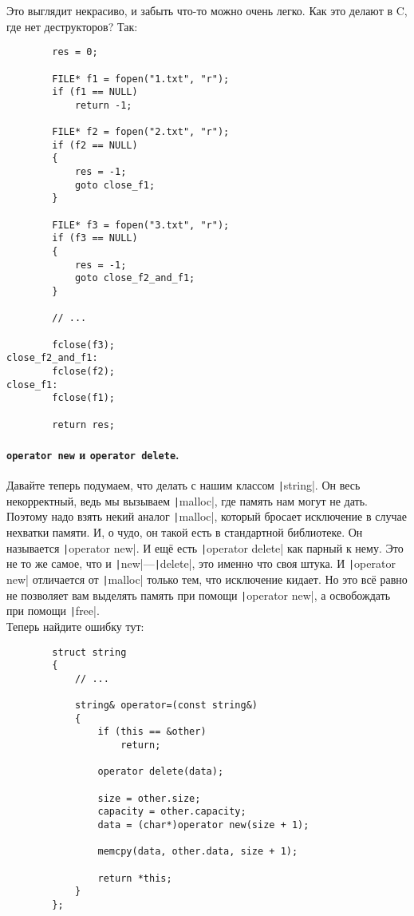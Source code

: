 \documentclass{article}
\begin{document}
    Это выглядит некрасиво, и забыть что-то можно очень легко. Как это делают в C, где нет деструкторов? Так:
    \begin{verbatim}
        res = 0;

        FILE* f1 = fopen("1.txt", "r");
        if (f1 == NULL)
            return -1;
        
        FILE* f2 = fopen("2.txt", "r");
        if (f2 == NULL)
        {
            res = -1;
            goto close_f1;
        }
        
        FILE* f3 = fopen("3.txt", "r");
        if (f3 == NULL)
        {
            res = -1;
            goto close_f2_and_f1;
        }
        
        // ...
        
        fclose(f3);
close_f2_and_f1:
        fclose(f2);
close_f1:
        fclose(f1);

        return res;
    \end{verbatim}
    \paragraph{\texttt{operator new} и \texttt{operator delete}.}
    Давайте теперь подумаем, что делать с нашим классом \texttt|string|. Он весь некорректный, ведь мы вызываем \texttt|malloc|, где память нам могут не дать. Поэтому надо взять некий аналог \texttt|malloc|, который бросает исключение в случае нехватки памяти. И, о чудо, он такой есть в стандартной библиотеке. Он называется \texttt|operator new|. И ещё есть \texttt|operator delete| как парный к нему. Это не то же самое, что и \texttt|new|---\texttt|delete|, это именно что своя штука. И \texttt|operator new| отличается от \texttt|malloc| только тем, что исключение кидает. Но это всё равно не позволяет вам выделять память при помощи \texttt|operator new|, а освобождать при помощи \texttt|free|.\\
    Теперь найдите ошибку тут:
    \begin{verbatim}
        struct string
        {
            // ...

            string& operator=(const string&)
            {
                if (this == &other)
                    return;

                operator delete(data);

                size = other.size;
                capacity = other.capacity;
                data = (char*)operator new(size + 1);

                memcpy(data, other.data, size + 1);

                return *this;
            }
        };
    \end{verbatim}
\end{document}
